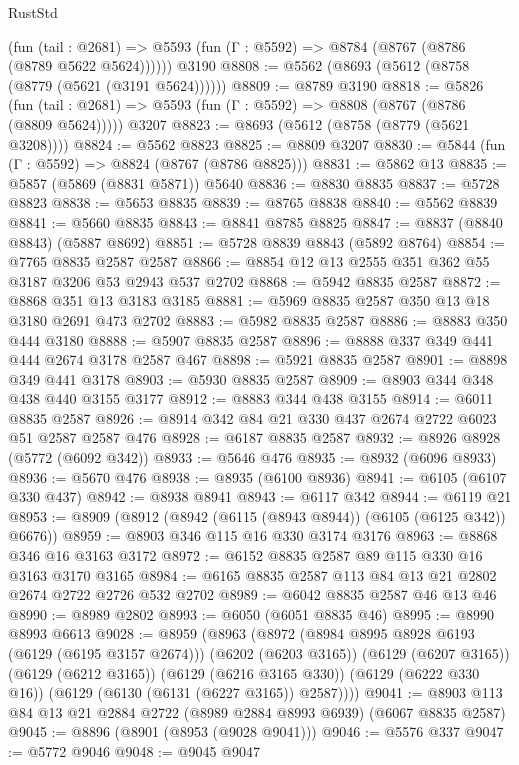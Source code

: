 \begin{lexlean}{RustStd}
\begin{coremodule}
      (fun (tail : @2681) => @5593 (fun (Γ : @5592) => @8784 (@8767 (@8786 (@8789 @5622 @5624))))))
    @3190
@8808 := @5562 (@8693 (@5612 (@8758 (@8779 (@5621 (@3191 @5624))))))
@8809 := @8789 @3190
@8818 := @5826
    (fun (tail : @2681) => @5593 (fun (Γ : @5592) => @8808 (@8767 (@8786 (@8809 @5624)))))
    @3207
@8823 := @8693 (@5612 (@8758 (@8779 (@5621 @3208))))
@8824 := @5562 @8823
@8825 := @8809 @3207
@8830 := @5844 (fun (Γ : @5592) => @8824 (@8767 (@8786 @8825)))
@8831 := @5862 @13
@8835 := @5857 (@5869 (@8831 @5871)) @5640
@8836 := @8830 @8835
@8837 := @5728 @8823
@8838 := @5653 @8835
@8839 := @8765 @8838
@8840 := @5562 @8839
@8841 := @5660 @8835
@8843 := @8841 @8785 @8825
@8847 := @8837 (@8840 @8843) (@5887 @8692)
@8851 := @5728 @8839 @8843 (@5892 @8764)
@8854 := @7765 @8835 @2587 @2587
@8866 := @8854 @12 @13 @2555 @351 @362 @55 @3187 @3206 @53 @2943 @537 @2702
@8868 := @5942 @8835 @2587
@8872 := @8868 @351 @13 @3183 @3185
@8881 := @5969 @8835 @2587 @350 @13 @18 @3180 @2691 @473 @2702
@8883 := @5982 @8835 @2587
@8886 := @8883 @350 @444 @3180
@8888 := @5907 @8835 @2587
@8896 := @8888 @337 @349 @441 @444 @2674 @3178 @2587 @467
@8898 := @5921 @8835 @2587
@8901 := @8898 @349 @441 @3178
@8903 := @5930 @8835 @2587
@8909 := @8903 @344 @348 @438 @440 @3155 @3177
@8912 := @8883 @344 @438 @3155
@8914 := @6011 @8835 @2587
@8926 := @8914 @342 @84 @21 @330 @437 @2674 @2722 @6023 @51 @2587 @2587 @476
@8928 := @6187 @8835 @2587
@8932 := @8926 @8928 (@5772 (@6092 @342))
@8933 := @5646 @476
@8935 := @8932 (@6096 @8933)
@8936 := @5670 @476
@8938 := @8935 (@6100 @8936)
@8941 := @6105 (@6107 @330 @437)
@8942 := @8938 @8941
@8943 := @6117 @342
@8944 := @6119 @21
@8953 := @8909 (@8912 (@8942 (@6115 (@8943 @8944)) (@6105 (@6125 @342)) @6676))
@8959 := @8903 @346 @115 @16 @330 @3174 @3176
@8963 := @8868 @346 @16 @3163 @3172
@8972 := @6152 @8835 @2587 @89 @115 @330 @16 @3163 @3170 @3165
@8984 := @6165 @8835 @2587 @113 @84 @13 @21 @2802 @2674 @2722 @2726 @532 @2702
@8989 := @6042 @8835 @2587 @46 @13 @46
@8990 := @8989 @2802
@8993 := @6050 (@6051 @8835 @46)
@8995 := @8990 @8993 @6613
@9028 := @8959
    (@8963
      (@8972
        (@8984 @8995 @8928 @6193 (@6129 (@6195 @3157 @2674)))
        (@6202 (@6203 @3165))
        (@6129 (@6207 @3165))
        (@6129 (@6212 @3165))
        (@6129 (@6216 @3165 @330))
        (@6129 (@6222 @330 @16))
        (@6129 (@6130 (@6131 (@6227 @3165)) @2587))))
@9041 := @8903 @113 @84 @13 @21 @2884 @2722 (@8989 @2884 @8993 @6939) (@6067 @8835 @2587)
@9045 := @8896 (@8901 (@8953 (@9028 @9041)))
@9046 := @5576 @337
@9047 := @5772 @9046
@9048 := @9045 @9047

\end{coremodule}
\end{lexlean}

